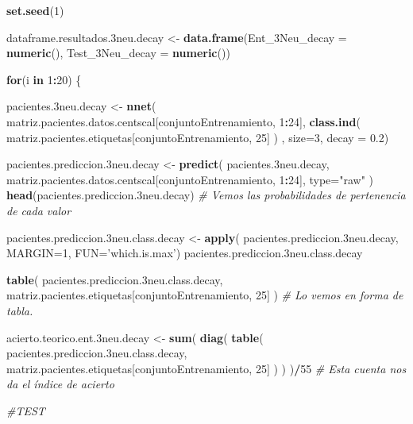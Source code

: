 \documentclass[]{article}
\newenvironment{Shaded}{\begin{snugshade}}{\end{snugshade}}
\newcommand{\KeywordTok}[1]{\textcolor[rgb]{0.13,0.29,0.53}{\textbf{#1}}}
\newcommand{\DataTypeTok}[1]{\textcolor[rgb]{0.13,0.29,0.53}{#1}}
\newcommand{\DecValTok}[1]{\textcolor[rgb]{0.00,0.00,0.81}{#1}}
\newcommand{\FloatTok}[1]{\textcolor[rgb]{0.00,0.00,0.81}{#1}}
\newcommand{\StringTok}[1]{\textcolor[rgb]{0.31,0.60,0.02}{#1}}
\newcommand{\CommentTok}[1]{\textcolor[rgb]{0.56,0.35,0.01}{\textit{#1}}}
\newcommand{\ControlFlowTok}[1]{\textcolor[rgb]{0.13,0.29,0.53}{\textbf{#1}}}
\newcommand{\OperatorTok}[1]{\textcolor[rgb]{0.81,0.36,0.00}{\textbf{#1}}}
\newcommand{\NormalTok}[1]{#1}
\begin{document}
\begin{Shaded}
\begin{Highlighting}[]
\KeywordTok{set.seed}\NormalTok{(}\DecValTok{1}\NormalTok{)}

\NormalTok{dataframe.resultados.3neu.decay <-}\StringTok{ }\KeywordTok{data.frame}\NormalTok{(}\DataTypeTok{Ent_3Neu_decay =} \KeywordTok{numeric}\NormalTok{(),}
                                              \DataTypeTok{Test_3Neu_decay =} \KeywordTok{numeric}\NormalTok{())}

\ControlFlowTok{for}\NormalTok{(i }\ControlFlowTok{in} \DecValTok{1}\OperatorTok{:}\DecValTok{20}\NormalTok{)}
\NormalTok{\{}

\NormalTok{  pacientes.3neu.decay <-}\StringTok{ }\KeywordTok{nnet}\NormalTok{( matriz.pacientes.datos.centscal[conjuntoEntrenamiento, }\DecValTok{1}\OperatorTok{:}\DecValTok{24}\NormalTok{], }\KeywordTok{class.ind}\NormalTok{( matriz.pacientes.etiquetas[conjuntoEntrenamiento, }\DecValTok{25}\NormalTok{] ) , }\DataTypeTok{size=}\DecValTok{3}\NormalTok{, }\DataTypeTok{decay =} \FloatTok{0.2}\NormalTok{)}
  
\NormalTok{  pacientes.prediccion.3neu.decay <-}\StringTok{ }\KeywordTok{predict}\NormalTok{( pacientes.3neu.decay, matriz.pacientes.datos.centscal[conjuntoEntrenamiento, }\DecValTok{1}\OperatorTok{:}\DecValTok{24}\NormalTok{], }\DataTypeTok{type=}\StringTok{"raw"}\NormalTok{ )}
  \KeywordTok{head}\NormalTok{(pacientes.prediccion.3neu.decay) }\CommentTok{# Vemos las probabilidades de pertenencia de cada valor}
  
  
\NormalTok{  pacientes.prediccion.3neu.class.decay <-}\StringTok{ }\KeywordTok{apply}\NormalTok{( pacientes.prediccion.3neu.decay, }\DataTypeTok{MARGIN=}\DecValTok{1}\NormalTok{, }\DataTypeTok{FUN=}\StringTok{'which.is.max'}\NormalTok{)}
\NormalTok{  pacientes.prediccion.3neu.class.decay}
  
  
  \KeywordTok{table}\NormalTok{( pacientes.prediccion.3neu.class.decay, matriz.pacientes.etiquetas[conjuntoEntrenamiento, }\DecValTok{25}\NormalTok{] )  }\CommentTok{# Lo vemos en forma de tabla.}
  
  
\NormalTok{  acierto.teorico.ent.3neu.decay <-}\StringTok{ }\KeywordTok{sum}\NormalTok{( }\KeywordTok{diag}\NormalTok{( }\KeywordTok{table}\NormalTok{( pacientes.prediccion.3neu.class.decay, matriz.pacientes.etiquetas[conjuntoEntrenamiento, }\DecValTok{25}\NormalTok{] ) ) )}\OperatorTok{/}\DecValTok{55} \CommentTok{# Esta cuenta nos da el índice de acierto}
  
  \CommentTok{#TEST}
  

\end{Highlighting}
\end{Shaded}
\end{document}
